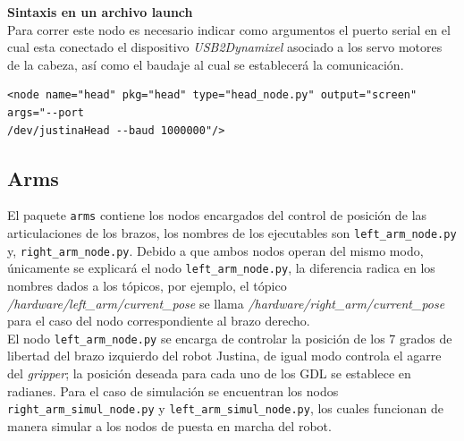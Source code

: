 \documentclass[a4paper,usenames,dvipsnames,svgnames,table]{book}
\begin{document}
\textbf{Sintaxis en un archivo launch}\\
Para correr este nodo es necesario indicar como argumentos el puerto serial en el cual esta conectado el dispositivo \textit{USB2Dynamixel} asociado a los servo motores de la cabeza, así como el baudaje al cual se establecerá la comunicación.\\
\begin{verbatim}
<node name="head" pkg="head" type="head_node.py" output="screen" args="--port 
/dev/justinaHead --baud 1000000"/>
\end{verbatim}

\subsection{Arms}
El paquete \texttt{arms} contiene los nodos encargados del control de posición de las articulaciones de los brazos, los nombres de los ejecutables son \texttt{left\_arm\_node.py} y, \texttt{right\_arm\_node.py}. Debido a que ambos nodos operan del mismo modo, únicamente se explicará el nodo \texttt{left\_arm\_node.py}, la diferencia radica en los nombres dados a los tópicos, por ejemplo, el tópico \textit{/hardware/left\_arm/current\_pose} se llama \textit{/hardware/right\_arm/current\_pose} para el caso del nodo correspondiente al brazo derecho.\\

El nodo \texttt{left\_arm\_node.py} se encarga de controlar la posición de los 7 grados de libertad del brazo izquierdo del robot Justina, de igual modo controla el agarre del \textit{gripper}; la posición deseada para cada uno de los GDL se establece en radianes. Para el caso de simulación se encuentran los nodos \texttt{right\_arm\_simul\_node.py} y \texttt{left\_arm\_simul\_node.py}, los cuales funcionan de manera simular a los nodos de puesta en marcha del robot.
\end{document}
